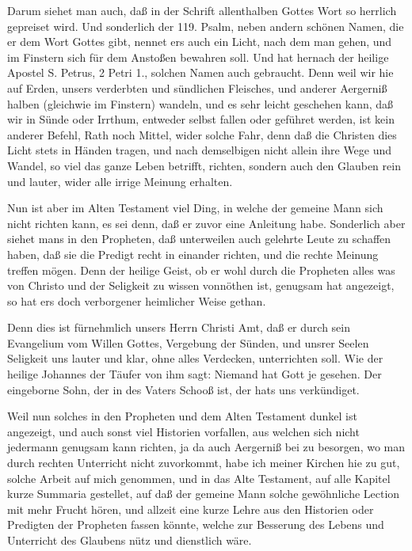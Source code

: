 Darum siehet man auch, daß in der Schrift allenthalben Gottes Wort so herrlich gepreiset wird. Und sonderlich der 119. Psalm, neben andern schönen Namen, die er dem Wort Gottes gibt, nennet ers auch ein Licht, nach dem man gehen, und im Finstern sich für dem Anstoßen bewahren soll. Und hat hernach der heilige Apostel S. Petrus, 2 Petri 1., solchen Namen auch gebraucht. Denn weil wir hie auf Erden, unsers verderbten und sündlichen Fleisches, und anderer Aergerniß halben (gleichwie im Finstern) wandeln, und es sehr leicht geschehen kann, daß wir in Sünde oder Irrthum, entweder selbst fallen oder geführet werden, ist kein anderer Befehl, Rath noch Mittel, wider solche Fahr, denn daß die Christen dies Licht stets in Händen tragen, und nach demselbigen nicht allein ihre Wege und Wandel, so viel das ganze Leben betrifft, richten, sondern auch den Glauben rein und lauter, wider alle irrige Meinung erhalten.

Nun ist aber im Alten Testament viel Ding, in welche der gemeine Mann sich nicht richten kann, es sei denn, daß er zuvor eine Anleitung habe. Sonderlich aber siehet mans in den Propheten, daß unterweilen auch gelehrte Leute zu schaffen haben, daß sie die Predigt recht in einander richten, und die rechte Meinung treffen mögen. Denn der heilige Geist, ob er wohl durch die Propheten alles was von Christo und der Seligkeit zu wissen vonnöthen ist, genugsam hat angezeigt, so hat ers doch verborgener heimlicher Weise gethan.

Denn dies ist fürnehmlich unsers Herrn Christi Amt, daß er durch sein Evangelium vom Willen Gottes, Vergebung der Sünden, und unsrer Seelen Seligkeit uns lauter und klar, ohne alles Verdecken, unterrichten soll. Wie der heilige Johannes der Täufer von ihm sagt: Niemand hat Gott je gesehen. Der eingeborne Sohn, der in des Vaters Schooß ist, der hats uns verkündiget.


Weil nun solches in den Propheten und dem Alten Testament dunkel ist angezeigt, und auch sonst viel Historien vorfallen, aus welchen sich nicht jedermann genugsam kann richten, ja da auch Aergerniß bei zu besorgen, wo man durch rechten Unterricht nicht zuvorkommt, habe ich meiner Kirchen hie zu gut, solche Arbeit auf mich genommen, und in das Alte Testament, auf alle Kapitel kurze Summaria gestellet, auf daß der gemeine Mann solche gewöhnliche Lection mit mehr Frucht hören, und allzeit eine kurze Lehre aus den Historien oder Predigten der Propheten fassen könnte, welche zur Besserung des Lebens und Unterricht des Glaubens nütz und dienstlich wäre.

